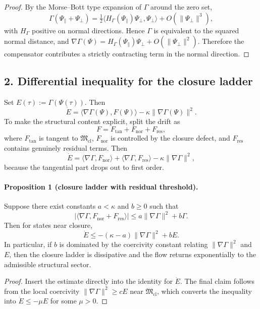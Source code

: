 \begin{proof}
By the Morse--Bott type expansion of $\Gamma$ around the zero set,
\[
\Gamma(\Psi_{\parallel}+\Psi_{\perp})=
\tfrac12\langle H_{\Gamma}(\Psi_{\parallel})\Psi_{\perp},\Psi_{\perp}\rangle
+O(\|\Psi_{\perp}\|^3),
\]
with $H_{\Gamma}$ positive on normal directions. Hence $\Gamma$ is equivalent to
the squared normal distance, and
$\nabla\Gamma(\Psi)=H_{\Gamma}(\Psi_{\parallel})\Psi_{\perp}+O(\|\Psi_{\perp}\|^2)$.
Therefore the compensator contributes a strictly contracting term in the normal
direction.
\end{proof}

\subsection*{2. Differential inequality for the closure ladder}
Set $E(\tau):=\Gamma(\Psi(\tau))$. Then
\[
\dot E = \langle \nabla\Gamma(\Psi),F(\Psi)\rangle - \kappa\|\nabla\Gamma(\Psi)\|^2.
\]
To make the structural content explicit, split the drift as
\[
F = F_{\mathrm{tan}} + F_{\mathrm{nor}} + F_{\mathrm{res}},
\]
where $F_{\mathrm{tan}}$ is tangent to $\mathfrak M_{\mathrm{cl}}$, $F_{\mathrm{nor}}$ is
controlled by the closure defect, and $F_{\mathrm{res}}$ contains genuinely residual
terms. Then
\[
\dot E
= \langle \nabla\Gamma,F_{\mathrm{nor}}\rangle
 + \langle \nabla\Gamma,F_{\mathrm{res}}\rangle
 - \kappa\|\nabla\Gamma\|^2,
\]
because the tangential part drops out to first order.

\paragraph{Proposition 1 (closure ladder with residual threshold).}
Suppose there exist constants $a<\kappa$ and $b\ge 0$ such that
\[
|\langle \nabla\Gamma,F_{\mathrm{nor}}+F_{\mathrm{res}}\rangle|
\le a\|\nabla\Gamma\|^2 + b\Gamma.
\]
Then for states near closure,
\[
\dot E \le -(\kappa-a)\|\nabla\Gamma\|^2 + bE.
\]
In particular, if $b$ is dominated by the coercivity constant relating
$\|\nabla\Gamma\|^2$ and $E$, then the closure ladder is dissipative and the flow
returns exponentially to the admissible structural sector.

\begin{proof}
Insert the estimate directly into the identity for $\dot E$. The final claim
follows from the local coercivity
$\|\nabla\Gamma\|^2\ge cE$ near $\mathfrak M_{\mathrm{cl}}$, which converts the
inequality into $\dot E\le -\mu E$ for some $\mu>0$.
\end{proof}

